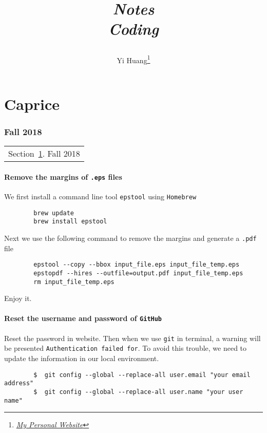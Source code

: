 \documentclass[10pt]{article}
\title{\begin{center}{\Huge \textit{Notes}}\\{{\itshape Coding}}\end{center}}
\author{Yi Huang\footnote{\href{https://yiihuang.com/}{\textit{My Personal Website}}}}
\affiliation{
University of Minnesota
}
\begin{document}
	\maketitle
	\flushbottom
	\newpage
	\pagestyle{fancynotes}
	\part{Caprice}
	\section{Fall 2018}\label{sec:fall2018}
	\begin{margintable}\vspace{.8in}\footnotesize
		\begin{tabularx}{\marginparwidth}{|X}
		Section~\ref{sec:fall2018}. Fall 2018\\
		\end{tabularx}
	\end{margintable}

	\subsection{Remove the margins of \texttt{.eps} files}

	We first install a command line tool \texttt{epstool} using \texttt{Homebrew}
	\begin{verbatim}
		brew update
		brew install epstool
	\end{verbatim}
	Next we use the following command to remove the margins and generate a \texttt{.pdf} file
	\begin{verbatim}
		epstool --copy --bbox input_file.eps input_file_temp.eps
		epstopdf --hires --outfile=output.pdf input_file_temp.eps
		rm input_file_temp.eps
	\end{verbatim}
	Enjoy it.

	\subsection{Reset the username and password of \texttt{GitHub}}

	Reset the password in website. Then when we use \texttt{git} in terminal, a warning will be presented \texttt{Authentication failed for}. To avoid this trouble, we need to update the information in our local environment.
	\begin{verbatim}
		$  git config --global --replace-all user.email "your email address"
		$  git config --global --replace-all user.name "your user name"
	\end{verbatim}
\end{document}
